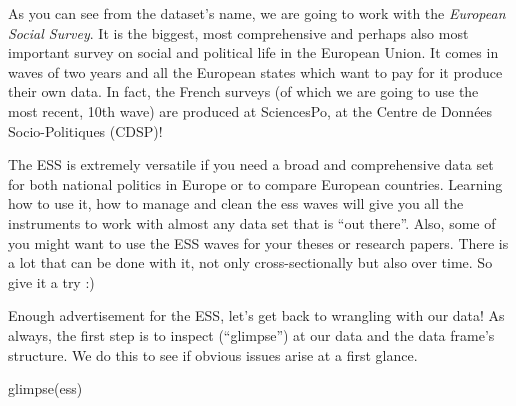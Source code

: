 \documentclass[
  letterpaper,
  DIV=11,
  numbers=noendperiod]{scrreprt}
\newenvironment{Shaded}{\begin{snugshade}}{\end{snugshade}}
\newcommand{\FunctionTok}[1]{\textcolor[rgb]{0.28,0.35,0.67}{#1}}
\newcommand{\NormalTok}[1]{\textcolor[rgb]{0.00,0.23,0.31}{#1}}
\begin{document}
As you can see from the dataset's name, we are going to work with the
\emph{European Social Survey}. It is the biggest, most comprehensive and
perhaps also most important survey on social and political life in the
European Union. It comes in waves of two years and all the European
states which want to pay for it produce their own data. In fact, the
French surveys (of which we are going to use the most recent, 10th wave)
are produced at SciencesPo, at the Centre de Données Socio-Politiques
(CDSP)!

The ESS is extremely versatile if you need a broad and comprehensive
data set for both national politics in Europe or to compare European
countries. Learning how to use it, how to manage and clean the ess waves
will give you all the instruments to work with almost any data set that
is ``out there''. Also, some of you might want to use the ESS waves for
your theses or research papers. There is a lot that can be done with it,
not only cross-sectionally but also over time. So give it a try :)

Enough advertisement for the ESS, let's get back to wrangling with our
data! As always, the first step is to inspect (``glimpse'') at our data
and the data frame's structure. We do this to see if obvious issues
arise at a first glance.

\begin{Shaded}
\begin{Highlighting}[]
\FunctionTok{glimpse}\NormalTok{(ess)}
\end{Highlighting}
\end{Shaded}
\end{document}
